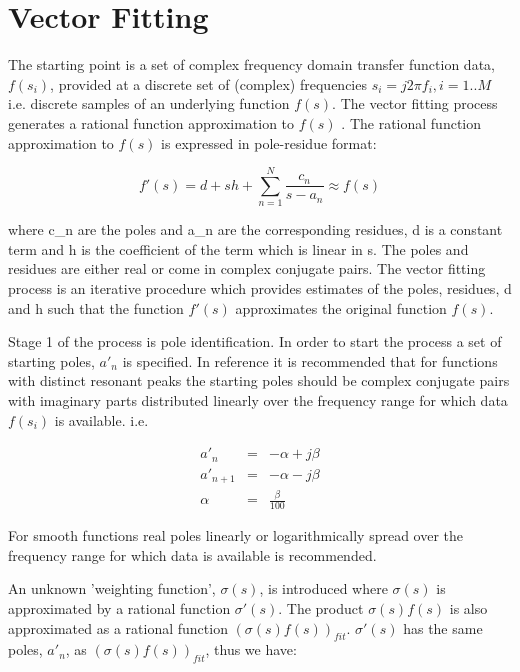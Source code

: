 \section{Vector Fitting}\label{vector_fit}

The starting point is a set of complex frequency domain transfer function data, $f(s_i)$, provided at a discrete set of (complex) frequencies $s_i=j 2 \pi f_i, i=1..M$ i.e. discrete samples of an underlying function $f(s)$.
The vector fitting process generates a rational function approximation to $f(s)$ \cite{vfit1}. The rational function approximation to $f(s)$ is expressed in pole-residue format:  

\begin{equation}\label{eq:vf1}
f' \left( s \right) = d+sh+\sum_{n=1}^N \frac{c_n}{s-a_n} \approx f(s)
\end{equation} 

where c\_n are the poles and a\_n are the corresponding residues, d is a constant term and h is the coefficient of the term which is linear in s. The poles and residues are either real or come in complex conjugate pairs. The vector fitting process is an iterative procedure which provides estimates of the poles, residues, d and h such that the function $f'(s)$ approximates the original function $f(s)$.

Stage 1 of the process is pole identification. In order to start the process a set of starting poles, $a'_n$ is specified. In reference \cite{vfit1} it is recommended that for functions with distinct resonant peaks the starting poles should be complex conjugate pairs with imaginary parts distributed linearly over the frequency range for which data $f(s_i)$ is available. i.e.

\begin{equation}\label{eq:vf2}
\begin{array}{rcl}
a'_n & = & -\alpha+j\beta \\
a'_{n+1} & = & -\alpha-j\beta \\
\alpha & = & \frac{\beta}{100}
\end{array}
\end{equation} 

For smooth functions real poles linearly or logarithmically spread over the frequency range for which data is available is recommended. 

An unknown 'weighting function', $\sigma(s)$, is introduced where $\sigma(s)$ is approximated by a rational function $\sigma'(s)$. The product  $\sigma(s)f(s)$ is also approximated as a rational function $(\sigma(s)f(s))_{fit}$. $\sigma'(s)$ has the same poles, $a'_n$, as $(\sigma(s)f(s))_{fit}$, thus we have:

